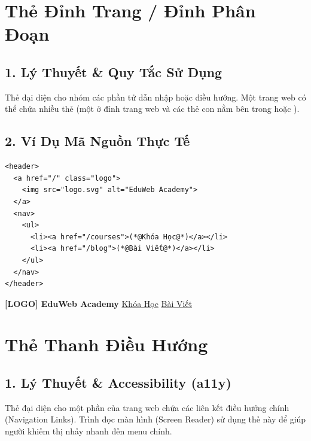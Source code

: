 \section{Thẻ Đỉnh Trang / Đỉnh Phân Đoạn }
\subsection{1. Lý Thuyết \& Quy Tắc Sử Dụng}
Thẻ  đại diện cho nhóm các phần tử dẫn nhập hoặc điều hướng. Một trang web có thể chứa nhiều thẻ  (một ở đỉnh trang web và các thẻ  con nằm bên trong  hoặc ).

\subsection{2. Ví Dụ Mã Nguồn Thực Tế}
\begin{codeWindow}
\begin{lstlisting}[language=HTML5]
<header>
  <a href="/" class="logo">
    <img src="logo.svg" alt="EduWeb Academy">
  </a>
  <nav>
    <ul>
      <li><a href="/courses">(*@Khóa Học@*)</a></li>
      <li><a href="/blog">(*@Bài Viết@*)</a></li>
    </ul>
  </nav>
</header>
\end{lstlisting}
\end{codeWindow}

\begin{browserWindow}
\sffamily\small
\begin{tcolorbox}[colback=primaryBlue!5, colframe=primaryBlue!30, arc=5pt, boxsep=3pt, left=12pt, right=12pt, top=6pt, bottom=6pt]
\textcolor{primaryBlue}{\bfseries [LOGO] EduWeb Academy} \hfill \textcolor{primaryBlue}{\underline{Khóa Học}} \quad \textcolor{primaryBlue}{\underline{Bài Viết}}
\end{tcolorbox}
\end{browserWindow}

\section{Thẻ Thanh Điều Hướng }
\subsection{1. Lý Thuyết \& Accessibility (a11y)}
Thẻ  đại diện cho một phần của trang web chứa các liên kết điều hướng chính (Navigation Links). Trình đọc màn hình (Screen Reader) sử dụng thẻ này để giúp người khiếm thị nhảy nhanh đến menu chính.

